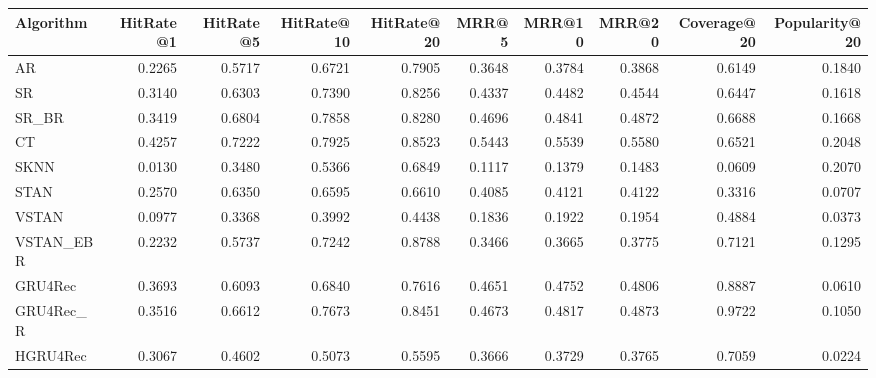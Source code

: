 \begin{tabular}{lrrrrrrrrr}
\toprule
 Algorithm &  HitRate@1 &  HitRate@5 &  HitRate@10 &  HitRate@20 &   MRR@5 &  MRR@10 &  MRR@20 &  Coverage@20 &  Popularity@20 \\
\midrule
        AR &     0.2265 &     0.5717 &      0.6721 &      0.7905 &  0.3648 &  0.3784 &  0.3868 &       0.6149 &         0.1840 \\
        SR &     0.3140 &     0.6303 &      0.7390 &      0.8256 &  0.4337 &  0.4482 &  0.4544 &       0.6447 &         0.1618 \\
     SR\_BR &     0.3419 &     0.6804 &      0.7858 &      0.8280 &  0.4696 &  0.4841 &  0.4872 &       0.6688 &         0.1668 \\
        CT &     0.4257 &     0.7222 &      0.7925 &      0.8523 &  0.5443 &  0.5539 &  0.5580 &       0.6521 &         0.2048 \\
      SKNN &     0.0130 &     0.3480 &      0.5366 &      0.6849 &  0.1117 &  0.1379 &  0.1483 &       0.0609 &         0.2070 \\
      STAN &     0.2570 &     0.6350 &      0.6595 &      0.6610 &  0.4085 &  0.4121 &  0.4122 &       0.3316 &         0.0707 \\
     VSTAN &     0.0977 &     0.3368 &      0.3992 &      0.4438 &  0.1836 &  0.1922 &  0.1954 &       0.4884 &         0.0373 \\
 VSTAN\_EBR &     0.2232 &     0.5737 &      0.7242 &      0.8788 &  0.3466 &  0.3665 &  0.3775 &       0.7121 &         0.1295 \\
   GRU4Rec &     0.3693 &     0.6093 &      0.6840 &      0.7616 &  0.4651 &  0.4752 &  0.4806 &       0.8887 &         0.0610 \\
 GRU4Rec\_R &     0.3516 &     0.6612 &      0.7673 &      0.8451 &  0.4673 &  0.4817 &  0.4873 &       0.9722 &         0.1050 \\
  HGRU4Rec &     0.3067 &     0.4602 &      0.5073 &      0.5595 &  0.3666 &  0.3729 &  0.3765 &       0.7059 &         0.0224 \\
\bottomrule
\end{tabular}
